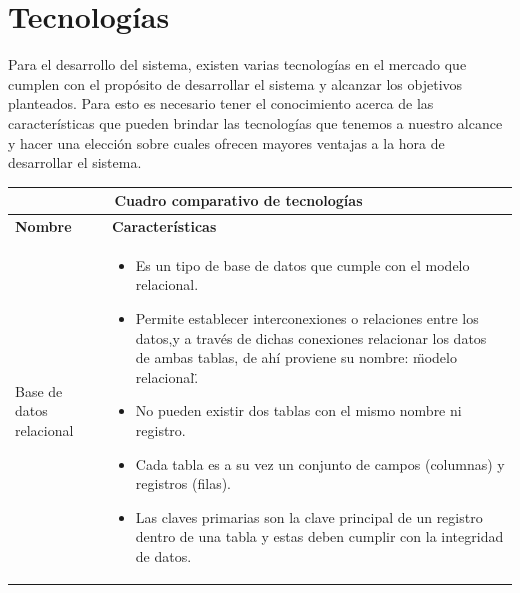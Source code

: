 \section{Tecnologías}
Para el desarrollo del sistema, existen varias tecnologías en el mercado que cumplen con el propósito de desarrollar el sistema y alcanzar los objetivos planteados. Para esto es necesario tener el conocimiento acerca de las características que pueden brindar las tecnologías que tenemos a nuestro alcance y hacer una elección sobre cuales ofrecen mayores ventajas a la hora de desarrollar el sistema.
\vspace{10mm}
	\begin{table}[b!]
    \centering
    \vspace{-30mm}
      \begin{tabular}{|p{2cm}|ll}
        \hline
        
        \multicolumn{2}{|c|}{{\bf Cuadro comparativo de tecnologías}} \\ 
        \hline
          \multicolumn{1}{|p{4cm}|}{{\bf Nombre}} & 
		  \multicolumn{1}{p{10cm}|}{{\bf Características}}\\

        \hline
          \multicolumn{1}{|p{5cm}|}{Base de datos relacional} & 
          \multicolumn{2}{p{10cm}|}{\begin{itemize}
          \vspace{-5mm}
        \item Es un tipo de base de datos que cumple con el modelo relacional.
        \item Permite establecer interconexiones o relaciones entre los datos,y a través de dichas conexiones relacionar los datos de ambas tablas, de ahí proviene su nombre: \"modelo relacional\".
        \item No pueden existir dos tablas con el mismo nombre ni registro.
        \item Cada tabla es a su vez un conjunto de campos (columnas) y registros (filas).
        \item Las claves primarias son la clave principal de un registro dentro de una tabla y estas deben cumplir con la integridad de datos.\cite{28}
       
      \end{itemize}} \\
         

\end{tabular}
\end{table}
